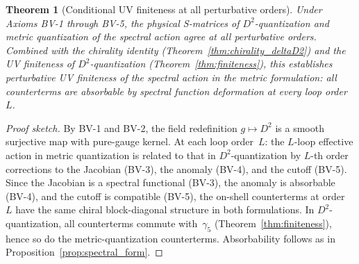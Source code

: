 \documentclass[12pt,a4paper]{article}
\newtheorem{theorem}{Theorem}[section]
\theoremstyle{definition}
\theoremstyle{remark}
\begin{document}
\begin{theorem}[Conditional UV finiteness at all perturbative orders]
\label{thm:conditional_uv}
Under Axioms BV-1 through BV-5, the physical S-matrices of
$D^2$-quantization and metric quantization of the spectral action agree
at all perturbative orders.  Combined with the chirality identity
(Theorem~\ref{thm:chirality_deltaD2}) and the UV finiteness of
$D^2$-quantization (Theorem~\ref{thm:finiteness}), this establishes
perturbative UV finiteness of the spectral action in the metric
formulation: all counterterms are absorbable by spectral function
deformation at every loop order~$L$.
\end{theorem}

\begin{proof}[Proof sketch]
By BV-1 and BV-2, the field redefinition $g \mapsto D^2$ is a smooth
surjective map with pure-gauge kernel.  At each loop order~$L$:
the $L$-loop effective action in metric quantization is related to
that in $D^2$-quantization by $L$-th order corrections to the Jacobian
(BV-3), the anomaly (BV-4), and the cutoff (BV-5).  Since the Jacobian
is a spectral functional (BV-3), the anomaly is absorbable (BV-4),
and the cutoff is compatible (BV-5), the on-shell counterterms at order~$L$
have the same chiral block-diagonal structure in both formulations.
In $D^2$-quantization, all counterterms commute with~$\gamma_5$
(Theorem~\ref{thm:finiteness}), hence so do the metric-quantization
counterterms.  Absorbability follows as in
Proposition~\ref{prop:spectral_form}.
\end{proof}
\end{document}
